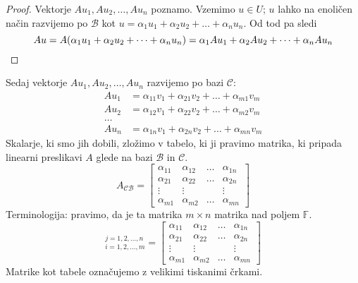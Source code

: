 \documentclass[10pt, a4paper]{article}
\newenvironment{noticeC}{%
  \tcolorbox[%
  notitle,
  empty,
  enhanced,  %
  breakable,
  coltext=black, 
  fontupper=\rmfamily,
  parbox=false,
  noparskip,
  sharp corners,
  boxrule=-1pt,  %
  frame hidden,
  left=7pt,  %
  right=7pt,
  top=5pt,
  bottom=5pt,
  before skip=2.5ex plus 2pt,
  after skip=2.5ex plus 2pt,
  overlay unbroken and last={%
  },
  ]}
{\endtcolorbox}
\newenvironment{dokaz}%
  {\begin{noticeC}\begin{proof}}%
  {\end{proof}\end{noticeC}}
\newcommand{\F}{\mathbb {F}}
\begin{document}
\begin{dokaz}
    Vektorje $Au_1, Au_2, \dots, Au_n$ poznamo.
    Vzemimo $u \in U$; $u$ lahko na enoličen način razvijemo po $\mathcal{B}$ kot
    $u = \alpha_1 u_1 + \alpha_2 u_2 + \dots + \alpha_n u_n.$
    Od tod pa sledi
    \begin{equation*}
        Au = A(\alpha_1 u_1 + \alpha_2 u_2 + \dots + \alpha_n u_n) = \alpha_1 A u_1 + \alpha_2 A u_2 + \dots + \alpha_n A u_n \qedhere
    \end{equation*}
\end{dokaz}

Sedaj vektorje $Au_1, Au_2, \dots, Au_n$ razvijemo po bazi $\mathcal{C}$: 
\begin{align*}
    Au_1 &= \alpha_{11} v_1 + \alpha_{21} v_2 + \dots + \alpha_{m1} v_m\\
    Au_2 &= \alpha_{12} v_1 + \alpha_{22} v_2 + \dots + \alpha_{m2} v_m\\
    \dots\\
    Au_n &= \alpha_{1n} v_1 + \alpha_{2n} v_2 + \dots + \alpha_{mn} v_m
\end{align*}
Skalarje, ki smo jih dobili, zložimo v tabelo, ki ji pravimo matrika, ki pripada linearni preslikavi $A$ glede na bazi $\mathcal{B}$ in $\mathcal{C}$.
\begin{equation*}
    A_{\mathcal{C} \mathcal{B}} = 
    \begin{bmatrix}
        \alpha_{11} & \alpha_{12} & \dots & \alpha_{1n}\\
        \alpha_{21} & \alpha_{22} & \dots & \alpha_{2n}\\
        \vdots & \vdots & & \vdots\\
        \alpha_{m1} & \alpha_{m2} & \dots & \alpha_{mn}
    \end{bmatrix}
\end{equation*}
Terminologija: pravimo, da je ta matrika $m \times n$ matrika nad poljem $\F$.
\begin{equation*}[\alpha_{ij}]_{i = 1,2, \dots, m} ^{j = 1,2,\dots, n} =
    \begin{bmatrix}
        \alpha_{11} & \alpha_{12} & \dots & \alpha_{1n}\\
        \alpha_{21} & \alpha_{22} & \dots & \alpha_{2n}\\
        \vdots & \vdots & & \vdots\\
        \alpha_{m1} & \alpha_{m2} & \dots & \alpha_{mn}
    \end{bmatrix} 
\end{equation*}
Matrike kot tabele označujemo z velikimi tiskanimi črkami.
\end{document}
